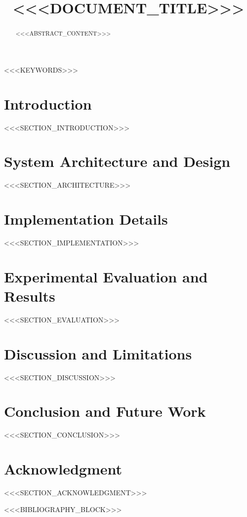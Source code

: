 \documentclass[conference]{IEEEtran}
\begin{document}
\title{<<<DOCUMENT_TITLE>>>}

\author{
}

\maketitle

\begin{abstract}
<<<ABSTRACT_CONTENT>>>
\end{abstract}

\begin{IEEEkeywords}
<<<KEYWORDS>>>
\end{IEEEkeywords}

\section{Introduction}
<<<SECTION_INTRODUCTION>>>

\section{System Architecture and Design}
<<<SECTION_ARCHITECTURE>>>

\section{Implementation Details}
<<<SECTION_IMPLEMENTATION>>>

\section{Experimental Evaluation and Results}
<<<SECTION_EVALUATION>>>

\section{Discussion and Limitations}
<<<SECTION_DISCUSSION>>>

\section{Conclusion and Future Work}
<<<SECTION_CONCLUSION>>>

\section*{Acknowledgment}
<<<SECTION_ACKNOWLEDGMENT>>>

<<<BIBLIOGRAPHY_BLOCK>>>
\end{document}
